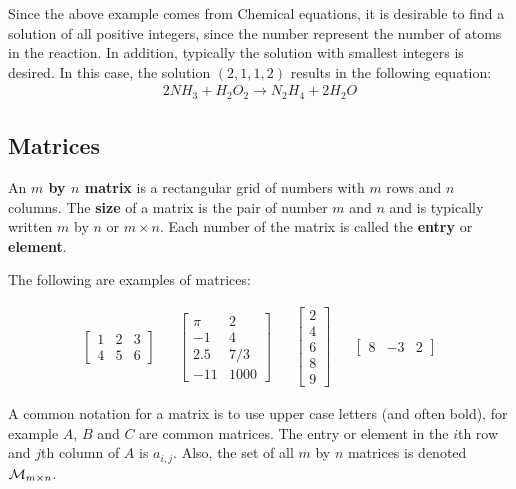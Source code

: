 Since the above example comes from Chemical equations, it is desirable to find a solution of all positive integers, since the number represent the number of atoms in the reaction.  In addition, typically the solution with smallest integers is desired.  In this case, the solution $(2,1,1,2)$ results in the following equation:
\begin{align*}
2 NH_3 + H_2O_2 \rightarrow N_2 H_4 + 2 H_2 O 
\end{align*}


\subsection{Matrices} \label{sect:matrices}

\begin{definition}
An \textbf{$m$ by $n$ matrix} is a rectangular grid of numbers with $m$ rows and $n$ columns. The \textbf{size} of a matrix is the pair of number $m$ and $n$ and is typically written $m$ by $n$ or $m \times n$.  Each number of the matrix is called the \textbf{entry} or \textbf{element}.  
\end{definition}

\begin{example} \label{ex:matrices}
The following are examples of matrices:

\begin{align*}
\begin{bmatrix}
1 & 2 &3 \\
4 & 5 & 6 
\end{bmatrix} && 
\begin{bmatrix}
\pi & 2 \\
-1 & 4 \\
2.5 & 7/3 \\
-11 & 1000
\end{bmatrix} &&
\begin{bmatrix}
2 \\ 4 \\ 6 \\ 8 \\ 9 
\end{bmatrix} && 
\begin{bmatrix}
8 & -3 & 2
\end{bmatrix}
\end{align*}

\end{example}

A common notation for a matrix is to use upper case letters (and often bold), for example $A$, $B$ and $C$ are common matrices.  The entry or element in the $i$th row and $j$th column of $A$ is $a_{i,j}$.    Also, the set of all $m$ by $n$ matrices is denoted ${\cal M}_{m \times n}$.  



